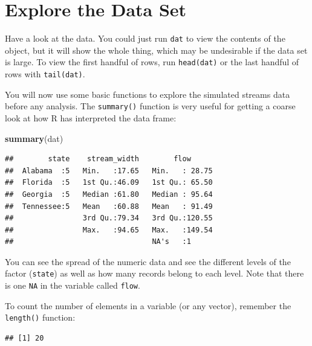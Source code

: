 \documentclass[]{book}
\newenvironment{Shaded}{\begin{snugshade}}{\end{snugshade}}
\newcommand{\KeywordTok}[1]{\textcolor[rgb]{0.13,0.29,0.53}{\textbf{#1}}}
\newcommand{\OperatorTok}[1]{\textcolor[rgb]{0.81,0.36,0.00}{\textbf{#1}}}
\newcommand{\NormalTok}[1]{#1}
\theoremstyle{definition}
\theoremstyle{definition}
\theoremstyle{definition}
\theoremstyle{remark}
\begin{document}
\section{Explore the Data Set}\label{data-summaries}

Have a look at the data. You could just run \texttt{dat} to view the
contents of the object, but it will show the whole thing, which may be
undesirable if the data set is large. To view the first handful of rows,
run \texttt{head(dat)} or the last handful of rows with
\texttt{tail(dat)}.

You will now use some basic functions to explore the simulated streams
data before any analysis. The \texttt{summary()} function is very useful
for getting a coarse look at how R has interpreted the data frame:

\begin{Shaded}
\begin{Highlighting}[]
\KeywordTok{summary}\NormalTok{(dat)}
\end{Highlighting}
\end{Shaded}

\begin{verbatim}
##        state    stream_width        flow       
##  Alabama  :5   Min.   :17.65   Min.   : 28.75  
##  Florida  :5   1st Qu.:46.09   1st Qu.: 65.50  
##  Georgia  :5   Median :61.80   Median : 95.64  
##  Tennessee:5   Mean   :60.88   Mean   : 91.49  
##                3rd Qu.:79.34   3rd Qu.:120.55  
##                Max.   :94.65   Max.   :149.54  
##                                NA's   :1
\end{verbatim}

You can see the spread of the numeric data and see the different levels
of the factor (\texttt{state}) as well as how many records belong to
each level. Note that there is one \texttt{NA} in the variable called
\texttt{flow}.

To count the number of elements in a variable (or any vector), remember
the \texttt{length()} function:

\begin{Shaded}
\end{Shaded}

\begin{verbatim}
## [1] 20
\end{verbatim}
\end{document}

